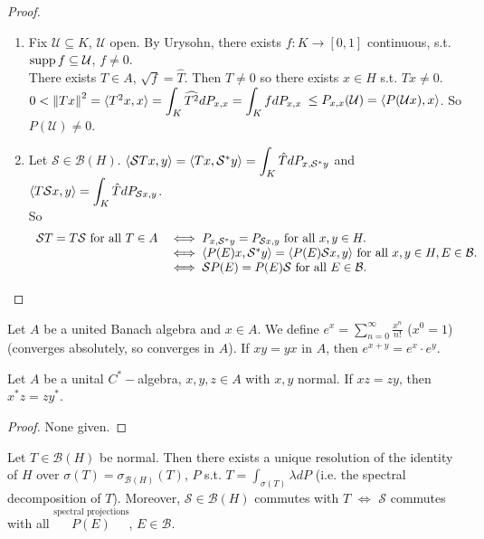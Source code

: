 \documentclass{article}
\begin{document}
\begin{proof}
    \begin{enumerate}[label = (\roman*), align = left]
        \item Fix $\mathcal{U}\subseteq K$, $\mathcal{U}$ open. By Urysohn, there exists $f:K\to [0,1]$ continuous, s.t. $\operatorname{supp} f\subseteq\mathcal{U}$, $f\neq 0$.\\
        There exists $T\in A$, $\sqrt{f}=\hat{T}$. Then $T\neq 0$ so there exists $x\in H$ s.t. $Tx\neq 0$. $0<\left\lVert Tx\right\rVert^2=\langle T^2x, x\rangle=\displaystyle\int_K \widehat{T^2}dP_{x,x}=\displaystyle\int_K fdP_{x,x}$ $\leq P_{x,x}(\mathcal{U})=\langle P(\mathcal{U}x), x\rangle$. So $P(\mathcal{U})\neq 0$. 
        \item Let $\mathcal{S}\in \mathcal{B}(H)$. $\langle \mathcal{S}Tx, y\rangle=\langle Tx, \mathcal{S}^*y\rangle= \displaystyle\int_K \hat{T}dP_{x,\mathcal{S}^*y}$ and $\langle T\mathcal{S}x, y\rangle = \displaystyle\int_K \hat{T}dP_{\mathcal{S}x,y}$.\\

        So $$
        \begin{array}{ll}
            \mathcal{S}T = T\mathcal{S} \text{ for all }T\in A
            &\iff P_{x,\mathcal{S}^*y}=P_{\mathcal{S}x,y} \text{ for all } x,y\in H.\\
            &\iff \langle P(E)x, \mathcal{S}^*y\rangle=\langle P(E)\mathcal{S}x, y\rangle  \text{ for all } x,y\in H, E\in \mathcal{B}.\\
            &\iff \mathcal{S}P(E) = P(E)\mathcal{S} \text{ for all } E\in \mathcal{B}.
        \end{array}
        $$
    \end{enumerate}
\end{proof}

 Let $A$ be a united Banach algebra and $x\in A$. We define $e^x = \displaystyle\sum^\infty_{n=0}\frac{x^n}{n!}$ ($x^0=1$) (converges absolutely, so converges in $A$). If $xy = yx$ in $A$, then $e^{x+y}=e^{x}\cdot e^{y}$.

\begin{boxlemma}\label{lemma: Fugledo-Putman-Rosenblum}
    Let $A$ be a unital $C^*-$algebra, $x,y,z\in A$ with $x,y$ normal. If $xz = zy$, then $x^*z = zy^*$.
\end{boxlemma}

\begin{proof}
    None given. 
\end{proof}

\begin{theorem}\label{thm: Spectral Theorem for normal operators}
    Let $T\in \mathcal{B}(H)$ be normal. Then there exists a unique resolution of the identity of $H$ over $\sigma(T)=\sigma_{\mathcal{B}(H)}(T)$, $P$ s.t. $T = \displaystyle\int_{\sigma(T)} \lambda dP$ (i.e. the spectral decomposition of $T$). Moreover, $\mathcal{S}\in \mathcal{B}(H)$ commutes with $T$ $\iff$ $\mathcal{S}$ commutes with all $\stackrel{\text{spectral projections}}{P(E)}$, $E\in \mathcal{B}$.
\end{theorem}
\end{document}
